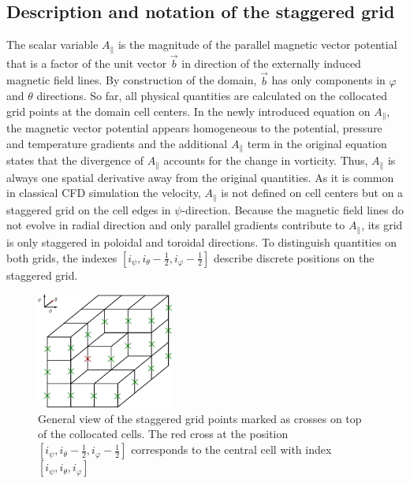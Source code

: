 \subsection{Description and notation of the staggered grid}
The scalar variable $A_\parallel$ is the magnitude of the parallel magnetic vector potential that is a factor of the unit vector $\vec{b}$ in direction of the externally induced magnetic field lines. By construction of the domain, $\vec{b}$ has only components in $\varphi$ and $\theta$ directions. So far, all physical quantities are calculated on the collocated grid points at the domain cell centers. In the newly introduced equation on $A_\parallel$, the magnetic vector potential appears homogeneous to the potential, pressure and temperature gradients and the additional $A_\parallel$ term in the original equation states that the divergence of $A_\parallel$ accounts for the change in vorticity. Thus, $A_\parallel$ is always one spatial derivative away from the original quantities. As it is common in classical CFD simulation the velocity, $A_\parallel$ is not defined on cell centers but on a staggered grid on the cell edges in $\psi$-direction. Because the magnetic field lines do not evolve in radial direction and only parallel gradients contribute to $A_\parallel$, its grid is only staggered in  poloidal and toroidal directions. To distinguish quantities on both grids, the indexes $[i_\psi, i_\theta - \frac{1}{2},i_\varphi-\frac{1}{2}]$ describe discrete positions on the staggered grid. \\

\begin{figure}[H]
	\centering
	\includegraphics[width=0.4\textwidth]{schemes/StaggeredGrid.pdf}
	\caption{General view of the staggered grid points marked as crosses on top of the collocated cells. The red cross at the position $[i_\psi, i_\theta - \frac{1}{2}, i_\varphi-\frac{1}{2}]$ corresponds to the central cell with index $[i_\psi, i_\theta, i_\varphi]$}
	\label{fig:StaggeredGridOverview}
\end{figure}

